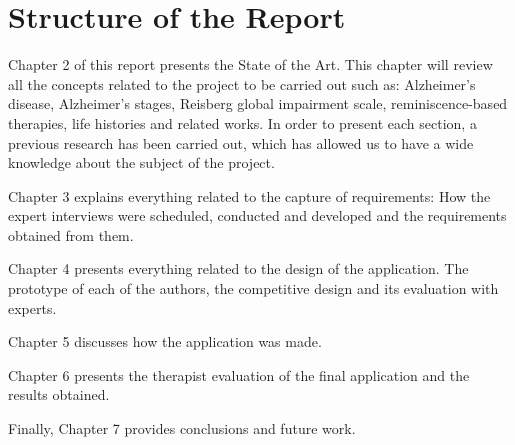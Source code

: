 \section{Structure of the Report}

Chapter 2 of this report presents the State of the Art. This chapter will review all the concepts related to the project to be carried out such as: Alzheimer's disease, Alzheimer's stages, Reisberg global impairment scale, reminiscence-based therapies, life histories and related works. In order to present each section, a previous research has been carried out, which has allowed us to have a wide knowledge about the subject of the project.
		
Chapter 3 explains everything related to the capture of requirements: How the expert interviews were scheduled, conducted and developed and the requirements obtained from them.

Chapter 4 presents everything related to the design of the application. The prototype of each of the authors, the competitive design and its evaluation with experts.

Chapter 5 discusses how the application was made.

Chapter 6 presents the therapist evaluation of the final application and the results obtained.

Finally, Chapter 7 provides conclusions and future work.










